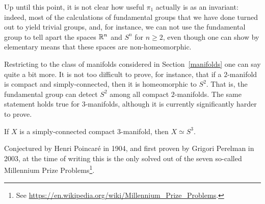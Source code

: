 Up until this point, it is not clear how useful $\pi_1$ actually is as an invariant: indeed, most of the calculations of fundamental groups that we have done turned out to yield trivial groups, and, for instance, we can not use the fundamental group to tell apart the spaces $\mathbb{R}^n$ and $S^n$ for $n \geq 2$, even though one can show by elementary means that these spaces are non-homeomorphic.

Restricting to the class of manifolds considered in Section~\ref{manifolds} one can say quite a bit more. It is not too difficult to prove, for instance, that if a $2$-manifold is compact and simply-connected, then it is homeomorphic to $S^2$. That is, the fundamental group can detect $S^2$ among all compact $2$-manifolds. The same statement holds true for $3$-manifolds, although it is currently significantly harder to prove.
\begin{thm}
  If $X$ is a simply-connected compact $3$-manifold, then $X \simeq S^3$.
\end{thm}
Conjectured by Henri Poincar{\'e} in 1904, and first proven by Grigori Perelman in 2003, at the time of writing this is the only solved out of the seven so-called Millennium Prize Problems\footnote{See \url{https://en.wikipedia.org/wiki/Millennium_Prize_Problems}.}.
